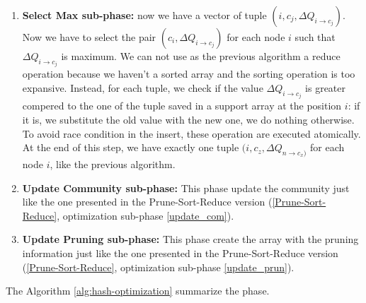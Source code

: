 \begin{enumerate}
	\item \textbf{Select Max sub-phase:} now we have a vector of tuple $(i, c_j, \Delta Q_{i\rightarrow c_j})$. Now we have to select the pair $(c_i, \Delta Q_{i\rightarrow c_j})$ for each node $i$ such that $\Delta Q_{i\rightarrow c_j}$ is maximum. We can not use as the previous algorithm a reduce operation because we haven't a sorted array and the sorting operation is too expansive. Instead, for each tuple, we check if the value $\Delta Q_{i\rightarrow c_j}$ is greater compered to the one of the tuple saved in a support array at the position $i$: if it is, we substitute the old value with the new one, we do nothing otherwise. To avoid race condition in the insert, these operation are executed atomically. At the end of this step, we have exactly one tuple $(i, c_z, \Delta Q_{n\rightarrow c_x)}$ for each node $i$, like the previous algorithm.
	
	
	\item \textbf{Update Community sub-phase:} This phase update the community just like the one presented in the Prune-Sort-Reduce version (\ref{Prune-Sort-Reduce}, optimization sub-phase \ref{update_com}).
	
	\item \textbf{Update Pruning sub-phase:} This phase create the array with the pruning information just like the one presented in the Prune-Sort-Reduce version (\ref{Prune-Sort-Reduce}, optimization sub-phase \ref{update_prun}).
\end{enumerate}
The Algorithm \ref{alg:hash-optimization} summarize the phase.
